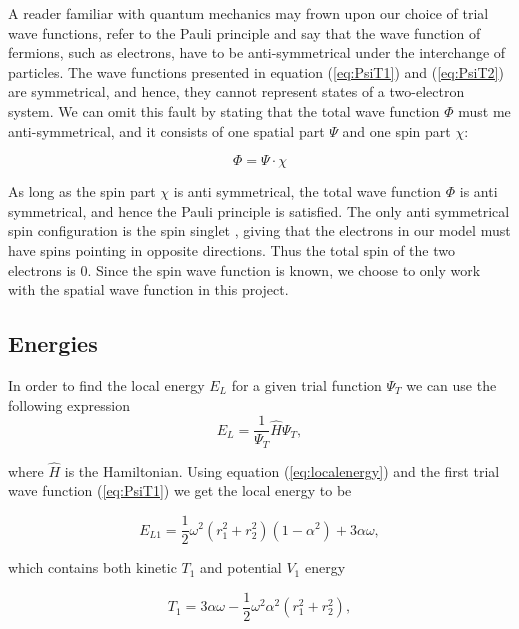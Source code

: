 \documentclass[norsk,a4paper,12pt]{article}
\begin{document}
A reader familiar with quantum mechanics may frown upon our choice of trial wave functions, refer to the Pauli principle and say that the wave function of fermions, such as electrons, have to be anti-symmetrical under the interchange of particles. The wave functions presented in equation (\ref{eq:PsiT1}) and (\ref{eq:PsiT2}) are symmetrical, and hence, they cannot represent states of a two-electron system. We can omit this fault by stating that the total wave function $\Phi$ must me anti-symmetrical, and it consists of one spatial part $\Psi$ and one spin part $\chi$:

\begin{equation}
    \Phi = \Psi \cdot \chi 
\end{equation}

As long as the spin part $\chi$ is anti symmetrical, the total wave function $\Phi$ is anti symmetrical, and hence the Pauli principle is satisfied. The only anti symmetrical spin configuration is the spin singlet \cite{Griffiths}, giving that the electrons in our model must have spins pointing in opposite directions. Thus the total spin of the two electrons is 0. Since the spin wave function is known, we choose to only work with the spatial wave function in this project.

\subsection{Energies} \label{Energies}
In order to find the local energy $E_L$ for a given trial function $\Psi_T$ we can use the following expression
\begin{equation}
E_L = \frac{1}{\Psi_T}\hat{H}\Psi_T,
\label{eq:localenergy}
\end{equation}

where $\hat{H}$ is the Hamiltonian. Using equation (\ref{eq:localenergy}) and the first trial wave function (\ref{eq:PsiT1}) we get the local energy to be

\begin{equation}
E_{L1} = \frac{1}{2}\omega^2 (r_1^2 + r_2^2)(1-\alpha^2) + 3\alpha \omega,
\label{eq:EL1}
\end{equation}

which contains both kinetic $T_1$ and potential $V_1$ energy

\begin{equation}
T_1 = 3\alpha \omega -\frac{1}{2}\omega^2\alpha^2\left(r_1^2 + r_2^2\right),
\label{eq:T_1}
\end{equation}
\end{document}
